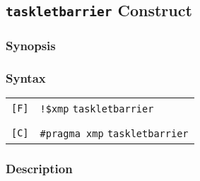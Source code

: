









\subsection{{\tt taskletbarrier} Construct}

\subsubsection*{Synopsis}

\subsubsection*{Syntax}

\begin{tabular}{ll}
\verb![F]! & \verb|!$xmp| {\tt taskletbarrier} \\
& \\
\verb![C]! & \verb|#pragma xmp| {\tt taskletbarrier} \\
\end{tabular}

\subsubsection*{Description}


